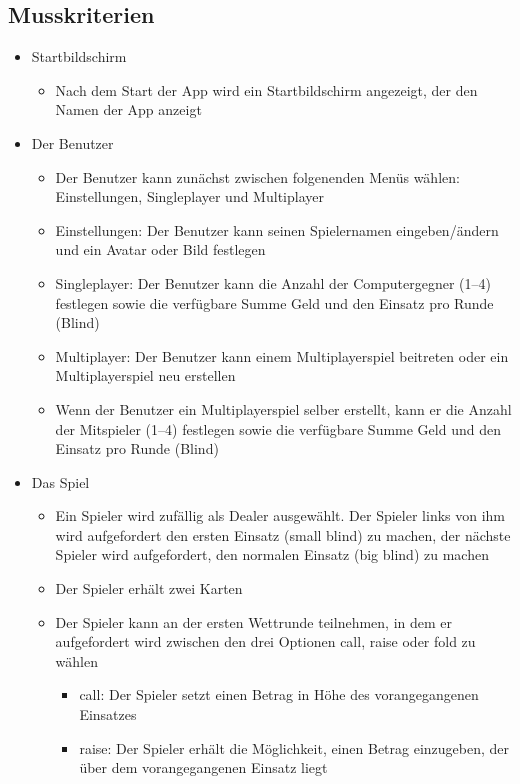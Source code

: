 \documentclass[a4paper,12pt,bibtotoc, parskip=full]{article}
\begin{document}
\subsection{Musskriterien}
\begin{itemize}
\item Startbildschirm
    \begin{itemize}
    \item Nach dem Start der App wird ein Startbildschirm angezeigt, der den Namen der App anzeigt
    \end{itemize}
\item Der Benutzer
    \begin{itemize}
    \item Der Benutzer kann zunächst zwischen folgenenden Menüs wählen: Einstellungen, Singleplayer und Multiplayer
    \item Einstellungen: Der Benutzer kann seinen Spielernamen eingeben/ändern und ein Avatar oder Bild festlegen
    \item Singleplayer: Der Benutzer kann die Anzahl der Computergegner (1--4) festlegen sowie die verfügbare Summe Geld und den Einsatz pro Runde (Blind)
    \item Multiplayer: Der Benutzer kann einem Multiplayerspiel beitreten oder ein Multiplayerspiel neu erstellen
    \item Wenn der Benutzer ein Multiplayerspiel selber erstellt, kann er die Anzahl der Mitspieler (1--4) festlegen sowie die verfügbare Summe Geld und den Einsatz pro Runde (Blind)
    \end{itemize}
\item Das Spiel
    \begin{itemize}
    \item Ein Spieler wird zufällig als Dealer ausgewählt. Der Spieler links von ihm wird aufgefordert den ersten Einsatz (small blind) zu machen, der nächste Spieler wird  aufgefordert, den normalen Einsatz (big blind) zu machen
    \item Der Spieler erhält zwei Karten
    \item Der Spieler kann an der ersten Wettrunde teilnehmen, in dem er aufgefordert wird zwischen den drei Optionen call, raise oder fold zu wählen
        \begin{itemize}
        \item call: Der Spieler setzt einen Betrag in Höhe des vorangegangenen Einsatzes
        \item raise: Der Spieler erhält die Möglichkeit, einen Betrag einzugeben, der über dem vorangegangenen Einsatz liegt

\end{itemize}
\end{itemize}
\end{itemize}
\end{document}
